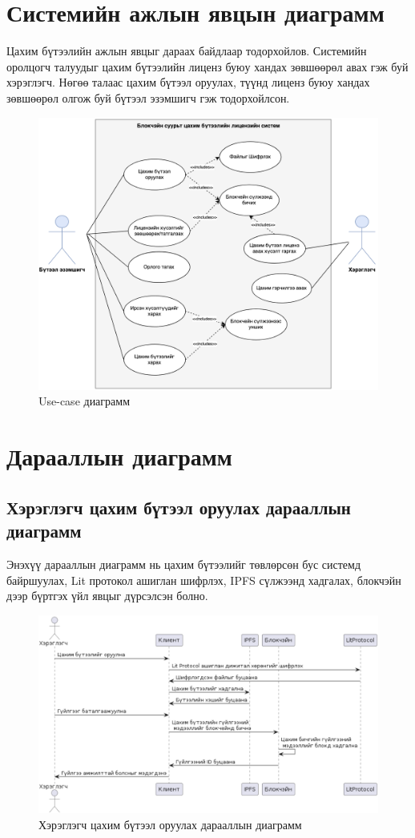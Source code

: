 \section{Системийн ажлын явцын диаграмм}
Цахим бүтээлийн ажлын явцыг дараах байдлаар тодорхойлов. Системийн оролцогч талуудыг цахим бүтээлийн лиценз буюу хандах зөвшөөрөл авах гэж буй хэрэглэгч. Нөгөө талаас цахим бүтээл оруулах, түүнд лиценз буюу хандах зөвшөөрөл олгож буй бүтээл эзэмшигч гэж тодорхойлсон.
\begin{figure}[h!]
	\centering
	\includegraphics[scale=0.36]{src/images/usecase.png}
	\caption{Use-case диаграмм}
\end{figure}

\newpage
\pagebreak
\section{Дарааллын диаграмм}
\subsection{Хэрэглэгч цахим бүтээл оруулах дарааллын диаграмм}
Энэхүү дарааллын диаграмм нь цахим бүтээлийг төвлөрсөн бус системд байршуулах, Lit протокол ашиглан шифрлэх, IPFS сүлжээнд хадгалах, блокчэйн дээр бүртгэх үйл явцыг дүрсэлсэн болно.

\begin{figure}[h!]
	\centering
	\includegraphics[scale=0.28]{src/images/sequence.png}
	\caption{Хэрэглэгч цахим бүтээл оруулах дарааллын диаграмм}
\end{figure}

